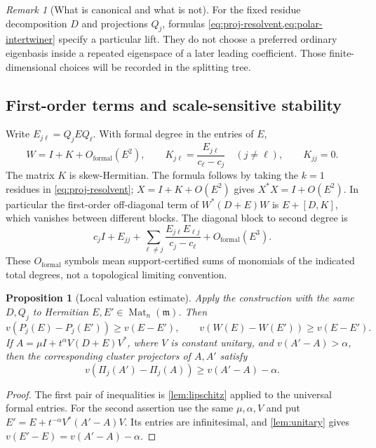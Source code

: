 \documentclass[11pt,letterpaper]{article}
\numberwithin{equation}{section}
\newtheorem{proposition}[theorem]{Proposition}
\theoremstyle{definition}
\theoremstyle{remark}
\newtheorem{remark}[theorem]{Remark}
\newcommand{\mm}{\mathfrak m}
\newcommand{\Mat}{\operatorname{Mat}}
\begin{document}
\begin{remark}[What is canonical and what is not]
For the fixed residue decomposition $D$ and projections $Q_j$, formulas
\cref{eq:proj-resolvent,eq:polar-intertwiner} specify a particular lift.
They do not choose a preferred ordinary eigenbasis inside a repeated
eigenspace of a later leading coefficient. Those finite-dimensional choices
will be recorded in the splitting tree.
\end{remark}

\subsection{First-order terms and scale-sensitive stability}

Write $E_{j\ell}=Q_jEQ_\ell$. With formal degree in the entries of $E$,
\begin{equation}\label{eq:first-order}
 W=I+K+O_{\mathrm{formal}}(E^2),\qquad
 K_{j\ell}=\frac{E_{j\ell}}{c_\ell-c_j}\quad(j\ne\ell),\qquad K_{jj}=0.
\end{equation}
The matrix $K$ is skew-Hermitian. The formula follows by taking the $k=1$
residues in \cref{eq:proj-resolvent}; $X=I+K+O(E^2)$ gives
$X^*X=I+O(E^2)$. In particular the first-order off-diagonal term of
$W^*(D+E)W$ is $E+[D,K]$, which vanishes between different blocks.
The diagonal block to second degree is
\begin{equation}\label{eq:second-order}
 c_jI+E_{jj}+
   \sum_{\ell\ne j}\frac{E_{j\ell}E_{\ell j}}{c_j-c_\ell}
       +O_{\mathrm{formal}}(E^3).
\end{equation}
These $O_{\mathrm{formal}}$ symbols mean support-certified sums of monomials
of the indicated total degrees, not a topological limiting convention.

\begin{proposition}[Local valuation estimate]\label{prop:local-stability}
Apply the construction with the same $D,Q_j$ to Hermitian
$E,E'\in\Mat_n(\mm)$. Then
\[
 v(P_j(E)-P_j(E'))\ge v(E-E'),\qquad
 v(W(E)-W(E'))\ge v(E-E').
\]
If $A=\mu I+t^\alpha V(D+E)V^*$, where $V$ is constant unitary, and
$v(A'-A)>\alpha$, then the corresponding cluster projectors of $A,A'$ satisfy
\begin{equation}\label{eq:gap-bound}
 v(\Pi_j(A')-\Pi_j(A))\ge v(A'-A)-\alpha.
\end{equation}
\end{proposition}
\begin{proof}
The first pair of inequalities is \cref{lem:lipschitz} applied to the
universal formal entries. For the second assertion use the same $\mu,\alpha,V$
and put $E'=E+t^{-\alpha}V^*(A'-A)V$. Its entries are infinitesimal, and
\cref{lem:unitary} gives $v(E'-E)=v(A'-A)-\alpha$.
\end{proof}
\end{document}
